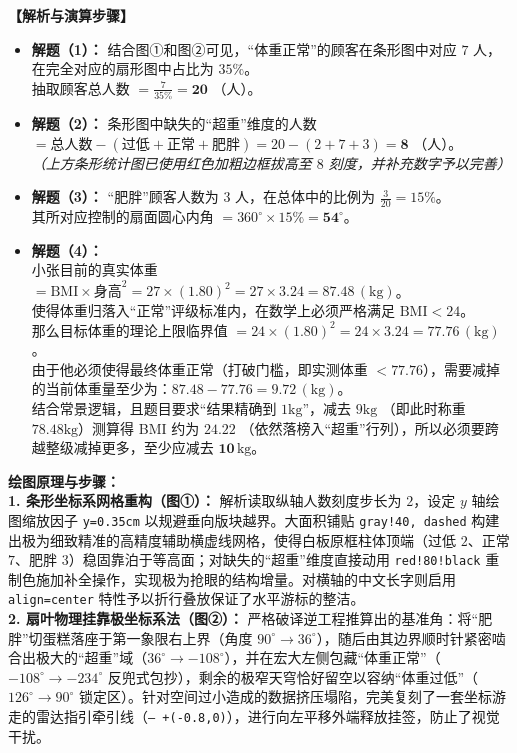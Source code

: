 \vspace{0.4cm}
\textbf{【解析与演算步骤】}
\begin{itemize}
    \item \textbf{解题（1）：} 结合图①和图②可见，“体重正常”的顾客在条形图中对应 $7$ 人，在完全对应的扇形图中占比为 $35\%$。\\
    抽取顾客总人数 $= \frac{7}{35\%} = \mathbf{20}$ （人）。
    \item \textbf{解题（2）：} 条形图中缺失的“超重”维度的人数 $= \text{总人数} - (\text{过低} + \text{正常} + \text{肥胖}) = 20 - (2 + 7 + 3) = \mathbf{8}$ （人）。\\
    \textit{（上方条形统计图已使用红色加粗边框拔高至 $8$ 刻度，并补充数字予以完善）}
    \item \textbf{解题（3）：} “肥胖”顾客人数为 $3$ 人，在总体中的比例为 $\frac{3}{20} = 15\%$。\\
    其所对应控制的扇面圆心内角 $= 360^\circ \times 15\% = \mathbf{54^\circ}$。
    \item \textbf{解题（4）：} \\
    小张目前的真实体重 $= \text{BMI} \times \text{身高}^2 = 27 \times (1.80)^2 = 27 \times 3.24 = 87.48 \, (\mathrm{kg})$。\\
    使得体重归落入“正常”评级标准内，在数学上必须严格满足 $\text{BMI} < 24$。\\
    那么目标体重的理论上限临界值 $= 24 \times (1.80)^2 = 24 \times 3.24 = 77.76 \, (\mathrm{kg})$。\\
    由于他必须使得最终体重正常（打破门槛，即实测体重 $< 77.76$），需要减掉的当前体重量至少为：$87.48 - 77.76 = 9.72 \, (\mathrm{kg})$。\\
    结合常景逻辑，且题目要求“结果精确到 $1\mathrm{kg}$”，减去 $9\mathrm{kg}$ （即此时称重 $78.48\mathrm{kg}$）测算得 BMI 约为 $24.22$ （依然落榜入“超重”行列），所以必须要跨越整级减掉更多，至少应减去 $\mathbf{10 \, \mathrm{kg}}$。
\end{itemize}

\vspace{0.4cm}
{\small\color{blue!70!black}
\textbf{绘图原理与步骤：}\\
\textbf{1. 条形坐标系网格重构（图①）：} 解析读取纵轴人数刻度步长为 $2$，设定 $y$ 轴绘图缩放因子 \texttt{y=0.35cm} 以规避垂向版块越界。大面积铺贴 \texttt{gray!40, dashed} 构建出极为细致精准的高精度辅助横虚线网格，使得白板原框柱体顶端（过低 $2$、正常 $7$、肥胖 $3$）稳固靠泊于等高面；对缺失的“超重”维度直接动用 \texttt{red!80!black} 重制色施加补全操作，实现极为抢眼的结构增量。对横轴的中文长字则启用 \texttt{align=center} 特性予以折行叠放保证了水平游标的整洁。\\
\textbf{2. 扇叶物理挂靠极坐标系法（图②）：} 严格破译逆工程推算出的基准角：将“肥胖”切蛋糕落座于第一象限右上界（角度 $90^\circ \to 36^\circ$），随后由其边界顺时针紧密啮合出极大的“超重”域（$36^\circ \to -108^\circ$），并在宏大左侧包藏“体重正常”（$-108^\circ \to -234^\circ$ 反兜式包抄），剩余的极窄天穹恰好留空以容纳“体重过低”（$126^\circ \to 90^\circ$ 锁定区）。针对空间过小造成的数据挤压塌陷，完美复刻了一套坐标游走的雷达指引牵引线（\texttt{-- +(-0.8,0)}），进行向左平移外端释放挂签，防止了视觉干扰。
}

